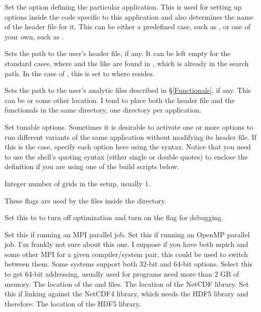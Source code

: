 \begin{klist}

 Set the  option defining the particular
application. This is used for setting up options inside the code
specific to this application and also determines the name of the
 header file for it. This can be either a predefined
case, such as , or one of your own, such as .

 Sets the path to the user's header file, if
any. It can be left empty for the standard cases, where 
and the like are found in , which is already in
the search path. In the case of , this is set to
 where  resides.

 Sets the path to the user's analytic files
described in \S\ref{Functionals}, if any. This can be 
or some other location. I tend to place both the header file and the
functionals in the same directory, one directory per application.

 Set tunable  options. Sometimes it is desirable
to activate one or more  options to run different variants of the
same application without modifying its header file. If this is the
case, specify each option here using the  syntax. Notice that
you need to use the shell's quoting syntax (either single or double
quotes) to enclose the definition if you are using one of the build
scripts below.

 Integer number of grids in the setup, usually 1.

 These flags are used by the files
inside the  directory.
\begin{klist}
   Set this to  to turn off optimization
and turn on the  flag for debugging.

   Set this if running an MPI parallel job.
   Set this if running an OpenMP parallel job.
   I'm frankly not sure about this one. I suppose
  if you have both mpich and some other MPI for a given
  compiler/system pair, this could be used to switch between them.
    Some systems support both 32-bit and 64-bit
  options. Select this to get 64-bit addressing, usually used for
  programs need more than 2 GB of memory.
   The location of the  and
   files.
   The location of the NetCDF library.
   Set this if linking against the NetCDF4
  library, which needs the HDF5 library and therefore:
   The location of the HDF5 library.
\end{klist}


\end{klist}
